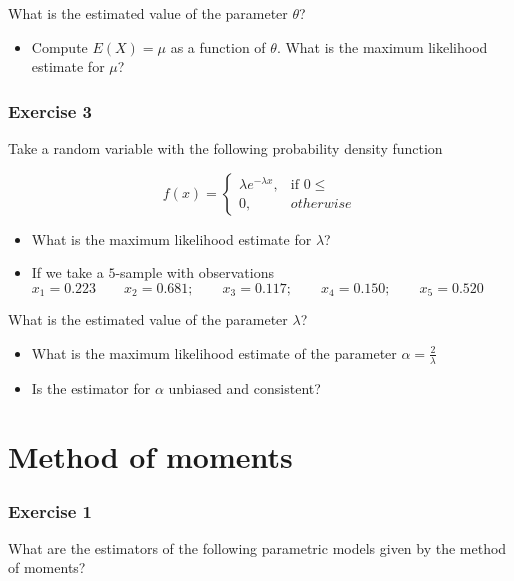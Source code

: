 \documentclass[
]{book}
\providecommand{\tightlist}{%
  \setlength{\itemsep}{0pt}\setlength{\parskip}{0pt}}
\begin{document}
What is the estimated value of the parameter \(\theta\)?

\begin{itemize}
\tightlist
\item
  Compute \(E(X)=\mu\) as a function of \(\theta\). What is the maximum likelihood estimate for \(\mu\)?
\end{itemize}

\hypertarget{exercise-3-4}{%
\subsubsection{Exercise 3}\label{exercise-3-4}}

Take a random variable with the following probability density function

\[
    f(x)= 
\begin{cases}
    \lambda e^{-\lambda x},& \text{if } 0 \leq\\
    0,& otherwise 
\end{cases}
\]

\begin{itemize}
\item
  What is the maximum likelihood estimate for \(\lambda\)?
\item
  If we take a \(5\)-sample with observations
  \(x_1 = 0.223 \qquad x_2 = 0.681; \qquad x_3 = 0.117; \qquad x_4 = 0.150; \qquad x_5 = 0.520\)
\end{itemize}

What is the estimated value of the parameter \(\lambda\)?

\begin{itemize}
\item
  What is the maximum likelihood estimate of the parameter \(\alpha=\frac{2}{\lambda}\)
\item
  Is the estimator for \(\alpha\) unbiased and consistent?
\end{itemize}

\hypertarget{method-of-moments-11}{%
\section{Method of moments}\label{method-of-moments-11}}

\hypertarget{exercise-1-8}{%
\subsubsection{Exercise 1}\label{exercise-1-8}}

What are the estimators of the following parametric models given by the method of moments?
\end{document}
